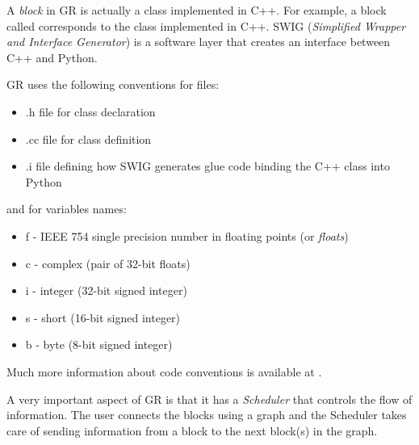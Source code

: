 A \emph{block} in GR is actually a class implemented in C++. For example, a block called  corresponds to the class
 implemented in C++. SWIG (\emph{Simplified Wrapper and Interface Generator}) is a software layer that creates an interface between C++ and Python. 

GR uses the following conventions for files:
\begin{itemize}
	\item .h file for class declaration
	\item .cc file for class definition
	\item .i file defining how SWIG generates glue code binding the C++ class into Python
\end{itemize}
and for variables names:
\begin{itemize}
	\item f - IEEE 754 single precision number in floating points (or \emph{floats})
	\item c - complex (pair of 32-bit floats)
	\item i - integer (32-bit signed integer)
	\item s - short (16-bit signed integer)
	\item b - byte (8-bit signed integer)
\end{itemize}
Much more information about code conventions is available at .

A very important aspect of GR is that it has a \emph{Scheduler} that controls the flow of information. The user connects the blocks using a graph and the Scheduler takes care of sending information from a block to the next block(s) in the graph.

